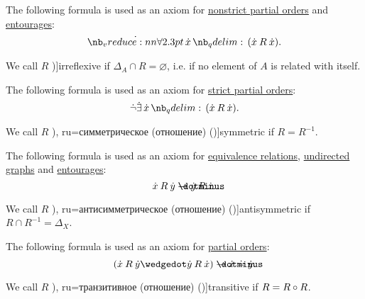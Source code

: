 \begin{definition}
\begin{thmenum}[resume=def:binary_relation]
    The following formula is used as an axiom for \hyperref[def:strict_partial_order]{nonstrict partial orders} and \hyperref[def:entourage]{entourages}:
    \begin{equation}\label{eq:def:binary_relation/reflexive}
      \qforall \synx (\synx \mathbin{R} \synx).
    \end{equation}

     We call \( R \) \term[ru=антирефлексивное (отношение) (\cite[def. 2.7]{Гуров2013})]{irreflexive} if \( \Delta_A \cap R = \varnothing \), i.e. if no element of \( A \) is related with itself.

    The following formula is used as an axiom for \hyperref[def:strict_partial_order]{strict partial orders}:
    \begin{equation}\label{eq:def:binary_relation/irreflexive}
      \synneg \qexists \synx (\synx \mathbin{R} \synx).
    \end{equation}

     We call \( R \) \term[bg=симетрична (релация) (\cite[369]{ГеновМиховскиМоллов1991}), ru=симметрическое (отношение) (\cite[def. 2.7]{Гуров2013})]{symmetric} if \( R = R^{-1} \).

    The following formula is used as an axiom for \hyperref[def:equivalence_relation]{equivalence relations}, \hyperref[def:undirected_multigraph]{undirected graphs} and \hyperref[def:entourage]{entourages}:
    \begin{equation}\label{eq:def:binary_relation/symmetric}
      \synx \mathbin{R} \syny \synimplies \syny \mathbin{R} \synx.
    \end{equation}

     We call \( R \) \term[bg=антисиметрична (релация) (\cite[369]{ГеновМиховскиМоллов1991}), ru=антисимметрическое (отношение) (\cite[def. 2.7]{Гуров2013})]{antisymmetric} if \( R \cap R^{-1} = \Delta_X \).

    The following formula is used as an axiom for \hyperref[def:partially_ordered_set]{partial orders}:
    \begin{equation}\label{eq:def:binary_relation/antisymmetric}
      (\synx \mathbin{R} \syny \synwedge \syny \mathbin{R} \synx) \synimplies \synx \syneq \syny.
    \end{equation}

     We call \( R \) \term[bg=транзитивна (релация) (\cite[369]{ГеновМиховскиМоллов1991}), ru=транзитивное (отношение) (\cite[def. 2.7]{Гуров2013})]{transitive} if \( R = R \bincirc R \).


\end{thmenum}
\end{definition}
